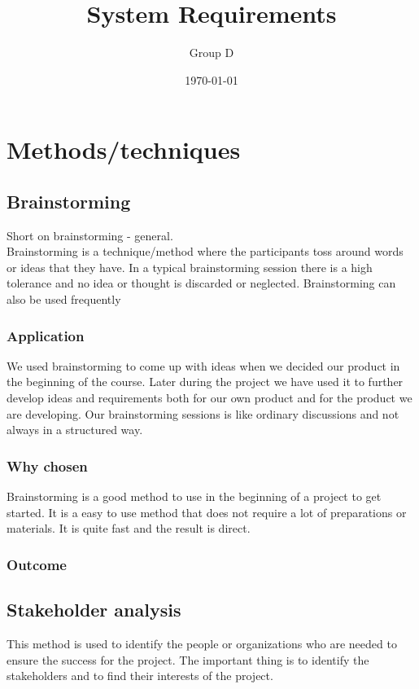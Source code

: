\documentclass[a4paper]{article}
\title{System Requirements}
\author{Group D}
\date{\today}
\begin{document}
  \tableofcontents

  \section{Methods/techniques}
  \subsection{Brainstorming}
  Short on brainstorming - general. \\
  Brainstorming is a technique/method where the participants toss around words or ideas that they have. In a typical brainstorming session there is a high tolerance and no idea or thought is discarded or neglected. Brainstorming can also be used frequently 
    \subsubsection{Application}
    We used brainstorming to come up with ideas when we decided our product in the beginning of the course. Later during the project we have used it to further develop ideas and requirements both for our own product and for the product we are developing. Our brainstorming sessions is like ordinary discussions and not always in a structured way.
    \subsubsection{Why chosen}

    Brainstorming is a good method to use in the beginning of a project to get started. It is a easy to use method that does not require a lot of preparations or materials. It is quite fast and the result is direct. 

    \subsubsection{Outcome}
    
    \subsection{Stakeholder analysis}
        This method is used to identify the people or organizations who are needed to ensure the success for the project. The important thing is to identify the stakeholders and to find their interests of the project. 
\end{document}
